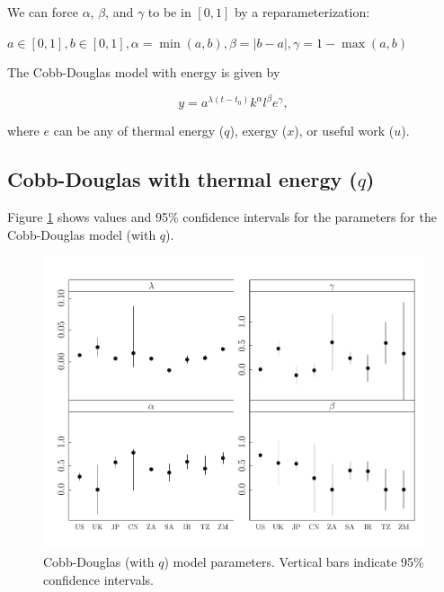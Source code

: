 \documentclass[preprint,authoryear,12pt]{elsarticle}\usepackage{graphicx, color}
\makeatletter
\def\maxwidth{ %
  \ifdim\Gin@nat@width>\linewidth
    \linewidth
  \else
    \Gin@nat@width
  \fi
}
\newenvironment{knitrout}{}{} %
\makeatother
\begin{document}
We can force $\alpha$, $\beta$, and $\gamma$ to be in $[0,1]$ by a reparameterization:

$a \in[0,1], b \in [0,1], \alpha=\min(a,b), \beta=|b-a|, \gamma = 1-\max(a,b)$

The Cobb-Douglas model with energy is given by

\begin{equation} \label{eq:CD_With_Energy}
  y = a^{\lambda (t-t_0)}k^{\alpha}l^{\beta}e^{\gamma},
\end{equation}

\noindent where $e$ can be any of thermal energy ($q$), exergy ($x$), or useful work ($u$).

\subsection{Cobb-Douglas with thermal energy ($q$)}

Figure \ref{fig:CDq_Params_Graph} shows values and 95\% confidence intervals for the parameters for the Cobb-Douglas model (with $q$).

\begin{knitrout}
\color{fgcolor}\begin{figure}[]

\includegraphics[width=\maxwidth]{figure/CDq_Params_Graph} \caption[Cobb-Douglas (with $q$) model parameters]{Cobb-Douglas (with $q$) model parameters. Vertical bars indicate 95\% confidence intervals.\label{fig:CDq_Params_Graph}}
\end{figure}


\end{knitrout}
\end{document}
